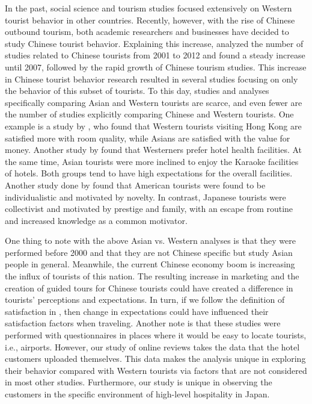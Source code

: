 \documentclass[smallextended,natbib]{svjour3}       %
\begin{document}
    In the past, social science and tourism studies focused extensively on Western tourist behavior in other countries. Recently, however, with the rise of Chinese outbound tourism, both academic researchers and businesses have decided to study Chinese tourist behavior. Explaining this increase, \cite{sun2017} analyzed the number of studies related to Chinese tourists from 2001 to 2012 and found a steady increase until 2007, followed by the rapid growth of Chinese tourism studies. This increase in Chinese tourist behavior research resulted in several studies focusing on only the behavior of this subset of tourists. To this day, studies and analyses specifically comparing Asian and Western tourists are scarce, and even fewer are the number of studies explicitly comparing Chinese and Western tourists. One example is a study by \cite{choi2000}, who found that Western tourists visiting Hong Kong are satisfied more with room quality, while Asians are satisfied with the value for money. Another study by \cite{bauer1993changing} found that Westerners prefer hotel health facilities. At the same time, Asian tourists were more inclined to enjoy the Karaoke facilities of hotels. Both groups tend to have high expectations for the overall facilities. Another study done by \cite{kim2000} found that American tourists were found to be individualistic and motivated by novelty. In contrast, Japanese tourists were collectivist and motivated by prestige and family, with an escape from routine and increased knowledge as a common motivator. 

    One thing to note with the above Asian vs. Western analyses is that they were performed before 2000 and that they are not Chinese specific but study Asian people in general. Meanwhile, the current Chinese economy boom is increasing the influx of tourists of this nation. The resulting increase in marketing and the creation of guided tours for Chinese tourists could have created a difference in tourists' perceptions and expectations. In turn, if we follow the definition of satisfaction in \cite{hunt1975}, then change in expectations could have influenced their satisfaction factors when traveling. Another note is that these studies were performed with questionnaires in places where it would be easy to locate tourists, i.e., airports. However, our study of online reviews takes the data that the hotel customers uploaded themselves. This data makes the analysis unique in exploring their behavior compared with Western tourists via factors that are not considered in most other studies. Furthermore, our study is unique in observing the customers in the specific environment of high-level hospitality in Japan.
\end{document}
